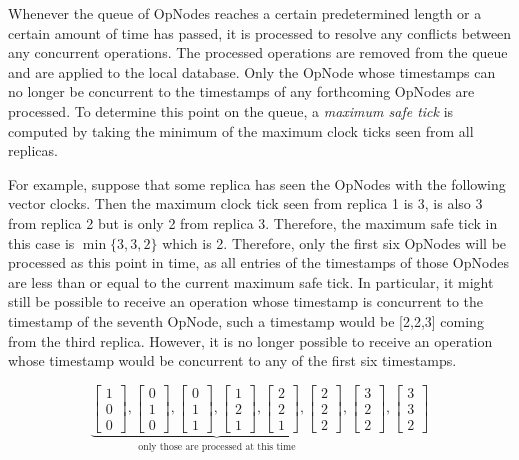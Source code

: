 \documentclass[sigconf,nonacm,11pt]{acmart}
\begin{document}
Whenever the queue of OpNodes reaches a certain predetermined length or a certain amount of time has passed, it is processed to resolve any conflicts between any concurrent operations. The processed operations are removed from the queue and are applied to the local database. Only the OpNode whose timestamps can no longer be concurrent to the timestamps of any forthcoming OpNodes are processed. To determine this point on the queue, a \emph{maximum safe tick} is computed by taking the minimum of the maximum clock ticks seen from all replicas. 

For example, suppose that some replica has seen the OpNodes with the following vector clocks. Then the maximum clock tick seen from replica 1 is 3, is also 3 from replica 2 but is only 2 from replica 3. Therefore, the maximum safe tick in this case is $\min\{3,3,2\}$ which is 2. Therefore, only the first six OpNodes will be processed as this point in time, as all entries of the timestamps of those OpNodes are less than or equal to the current maximum safe tick. In particular, it might still be possible to receive an operation whose timestamp is concurrent to the timestamp of the seventh OpNode, such a timestamp would be [2,2,3] coming from the third replica. However, it is no longer possible to receive an operation whose timestamp would be concurrent to any of the first six timestamps.

$$ \underbrace{\begin{bmatrix} 1\\0\\0 \end{bmatrix},
\begin{bmatrix} 0\\1\\0 \end{bmatrix},
\begin{bmatrix} 0\\1\\1 \end{bmatrix},
\begin{bmatrix} 1\\2\\1 \end{bmatrix},
\begin{bmatrix} 2\\2\\1 \end{bmatrix},
\begin{bmatrix} 2\\2\\2 \end{bmatrix}}_{\text{only those are processed at this time}}, 
\begin{bmatrix} 3\\2\\2 \end{bmatrix},
\begin{bmatrix} 3\\3\\2 \end{bmatrix}$$
\end{document}
